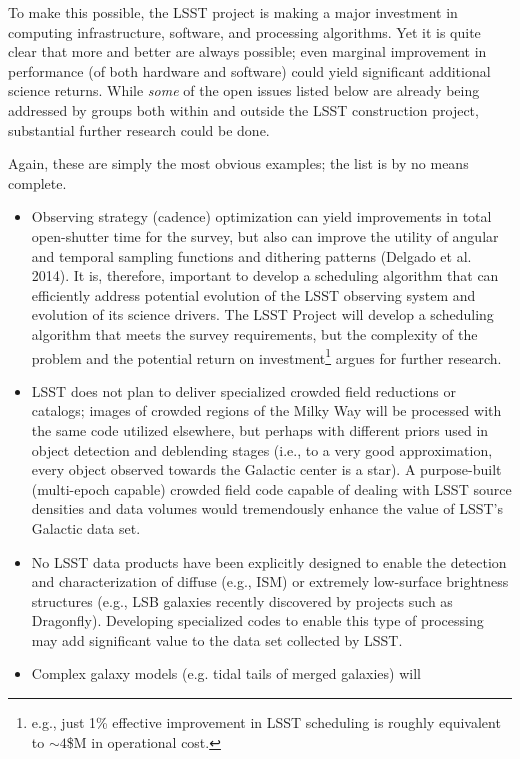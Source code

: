 \documentclass{iau}
\begin{document}
To make this possible, the LSST project is making a major investment in
computing infrastructure, software, and processing algorithms.  Yet it is
quite clear that more and better are always possible; even marginal
improvement in performance (of both hardware and software) could yield
significant additional science returns.  While {\em some} of the open issues
listed below are already being addressed by groups both within and outside
the LSST construction project, substantial further research could be done.

Again, these are simply the most obvious examples; the list is by no means complete.

\begin{itemize}
\item Observing strategy (cadence) optimization can yield improvements
  in total open-shutter time for the survey, but also can improve the
  utility of angular and temporal sampling functions and dithering
  patterns (Delgado et al. 2014). It is, therefore, important to
  develop a scheduling algorithm that can efficiently address
  potential evolution of the LSST observing system and evolution of
  its science drivers. The LSST Project will develop a scheduling algorithm
  that meets the survey requirements, but the complexity of the problem and
  the potential return on investment\footnote{e.g., just 1\% effective improvement
  in LSST scheduling is roughly equivalent to $\sim4$\$M in operational cost.}
  argues for further research.
\item LSST does not plan to deliver specialized crowded field reductions
  or catalogs; images of crowded regions of the Milky Way will be
  processed with the same code utilized elsewhere, but perhaps with
  different priors used in object detection and deblending stages (i.e., to
  a very good approximation, every object observed towards the Galactic
  center is a star). A purpose-built (multi-epoch capable) crowded field
  code capable of dealing with LSST source densities and data volumes
  would tremendously enhance the value of LSST's Galactic data set.
\item No LSST data products have been explicitly designed to enable the
  detection and characterization of diffuse (e.g., ISM) or extremely
  low-surface brightness structures (e.g., LSB galaxies recently discovered
  by projects such as Dragonfly). Developing specialized codes to enable this
  type of processing may add significant value to the data set
  collected by LSST.
\item Complex galaxy models (e.g. tidal tails of merged galaxies) will

\end{itemize}
\end{document}
